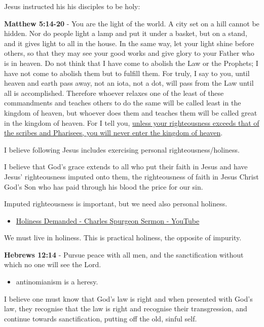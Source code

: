 \documentclass[11pt]{article}
\begin{document}
Jesus instructed his his disciples to be holy:

\textbf{Matthew 5:14-20} - You are the light of the world. A city set on a hill cannot be hidden. Nor do people light a lamp and put it under a basket, but on a stand, and it gives light to all in the house. In the same way, let your light shine before others, so that they may see your good works and give glory to your Father who is in heaven. Do not think that I have come to abolish the Law or the Prophets; I have not come to abolish them but to fulfill them. For truly, I say to you, until heaven and earth pass away, not an iota, not a dot, will pass from the Law until all is accomplished. Therefore whoever relaxes one of the least of these commandments and teaches others to do the same will be called least in the kingdom of heaven, but whoever does them and teaches them will be called great in the kingdom of heaven. For I tell you, \uline{unless your righteousness exceeds that of the scribes and Pharisees, you will never enter the kingdom of heaven}.

I believe following Jesus includes exercising personal righteousness/holiness.

I believe that God's grace extends to all who
put their faith in Jesus and have Jesus'
righteousness imputed onto them, the
righteousness of faith in Jesus Christ God's
Son who has paid through his blood the price
for our sin.

Imputed righteousness is important, but we need also personal holiness.
\begin{itemize}
\item \href{https://www.youtube.com/watch?v=S8rmiZRzqfg}{Holiness Demanded - Charles Spurgeon Sermon - YouTube}
\end{itemize}

We must live in holiness. This is practical holiness, the opposite of impurity.

\textbf{Hebrews 12:14} - Pursue peace with all men, and the sanctification without which no one will see the Lord.

\begin{itemize}
\item antinomianism is a heresy.
\end{itemize}

I believe one must know that God's law is
right and when presented with God's law, they
recognise that the law is right and recognise
their transgression, and continue towards
sanctification, putting off the old, sinful
self.
\end{document}
